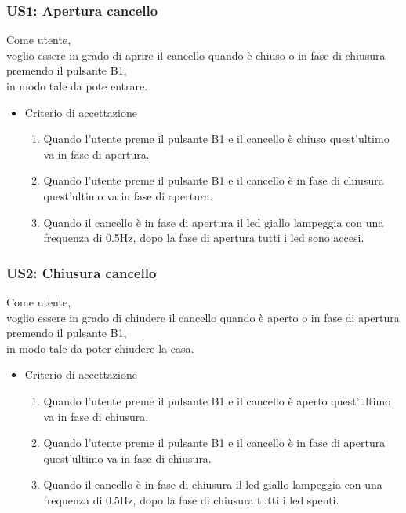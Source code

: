 \documentclass[12pt]{article}
\begin{document}
\subsubsection{US1: Apertura cancello}
Come utente, \\
voglio essere in grado di aprire il cancello quando è chiuso o in fase di chiusura premendo il pulsante B1, \\
in modo tale da pote entrare.
\begin{itemize}
    \item Criterio di accettazione
    \begin{enumerate}
        \item Quando l'utente preme il pulsante B1 e il cancello è chiuso quest'ultimo va in fase di apertura.
        \item Quando l'utente preme il pulsante B1 e il cancello è in fase di chiusura quest'ultimo va in fase di apertura.
        \item Quando il cancello è in fase di apertura il led giallo lampeggia con una frequenza di 0.5Hz, dopo la fase di apertura tutti i led sono accesi.
    \end{enumerate}
\end{itemize}
\subsubsection{US2: Chiusura cancello}
Come utente, \\
voglio essere in grado di chiudere il cancello quando è aperto o in fase di apertura premendo il pulsante B1, \\
in modo tale da poter chiudere la casa.
\begin{itemize}
    \item Criterio di accettazione
    \begin{enumerate}
        \item Quando l'utente preme il pulsante B1 e il cancello è aperto quest'ultimo va in fase di chiusura.
        \item Quando l'utente preme il pulsante B1 e il cancello è in fase di apertura quest'ultimo va in fase di chiusura.
        \item Quando il cancello è in fase di chiusura il led giallo lampeggia con una frequenza di 0.5Hz, dopo la fase di chiusura tutti i led spenti.
    \end{enumerate}
\end{itemize}
\end{document}

